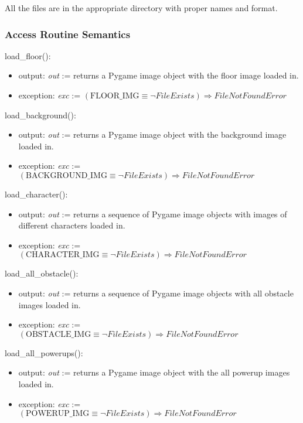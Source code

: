 \documentclass[12pt]{article}
\begin{document}
All the files are in the appropriate directory with proper names and format.

\subsubsection* {Access Routine Semantics}

load\_floor():
\begin{itemize}
    \item output: \textit{out} := returns a Pygame image object with the floor image loaded in.
    \item exception: \textit{exc} := $(\text{FLOOR\_IMG} \equiv \neg FileExists) \Rightarrow FileNotFoundError$
\end{itemize}

\noindent load\_background():
\begin{itemize}
    \item output: \textit{out} := returns a Pygame image object with the background image loaded in.
    \item exception: \textit{exc} := $(\text{BACKGROUND\_IMG} \equiv \neg FileExists) \Rightarrow FileNotFoundError$
\end{itemize}

\noindent load\_character():
\begin{itemize}
    \item output: \textit{out} := returns a sequence of Pygame image objects with images of different characters loaded in.
    \item exception: \textit{exc} := $(\text{CHARACTER\_IMG} \equiv \neg FileExists) \Rightarrow FileNotFoundError$
\end{itemize}

\noindent load\_all\_obstacle():
\begin{itemize}
    \item output: \textit{out} := returns a sequence of Pygame image objects with all obstacle images loaded in.
    \item exception: \textit{exc} := $(\text{OBSTACLE\_IMG} \equiv \neg FileExists) \Rightarrow FileNotFoundError$
\end{itemize}

\noindent load\_all\_powerups():
\begin{itemize}
    \item output: \textit{out} := returns a Pygame image object with the all powerup images loaded in.
    \item exception: \textit{exc} := $(\text{POWERUP\_IMG} \equiv \neg FileExists) \Rightarrow FileNotFoundError$
\end{itemize}
\end{document}
